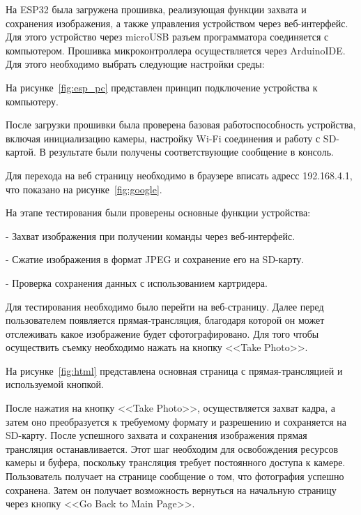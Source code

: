     На ESP32 была загружена прошивка, 
реализующая функции захвата и сохранения изображения, а также 
управления устройством через веб-интерфейс. Для этого устройство
через microUSB разъем программатора соединяется с компьютером.
Прошивка микроконтроллера осуществляется через ArduinoIDE.
Для этого необходимо выбрать следующие настройки среды:


    На рисунке~\ref{fig:esp_pc} представлен принцип подключение устройства к 
компьютеру.


После загрузки 
прошивки была проверена базовая работоспособность устройства, 
включая инициализацию камеры, настройку Wi-Fi соединения и 
работу с SD-картой. В результате были получены соответствующие 
сообщение в консоль.


    Для перехода на веб страницу необходимо в браузере вписать 
адресс 192.168.4.1, что показано на рисунке~\ref{fig:google}.


    На этапе тестирования были 
проверены основные функции устройства:

    - Захват изображения при получении команды через веб-интерфейс.

    - Сжатие изображения в формат JPEG и сохранение его на SD-карту.

    - Проверка сохранения данных с использованием картридера.

    Для тестирования необходимо было перейти на веб-страницу.
Далее перед пользователем появляется прямая-трансляция, 
благодаря которой он может отслеживать какое изображение 
будет сфотографировано. Для того чтобы осуществить съемку
необходимо нажать на кнопку <<Take Photo>>.

    На рисунке~\ref{fig:html} представлена основная страница с прямая-трансляцией
и используемой кнопкой.    


    После нажатия на кнопку <<Take Photo>>, осуществляется 
захват кадра, а затем оно преобразуется к требуемому
формату и разрешению и сохраняется на SD-карту. После 
успешного захвата и сохранения изображения прямая 
трансляция останавливается. Этот шаг необходим для 
освобождения ресурсов камеры и буфера, поскольку 
трансляция требует постоянного доступа к камере. 
Пользователь получает
на странице сообщение о том, что фотография успешно 
сохранена. Затем он получает возможность вернуться 
на начальную страницу через кнопку <<Go Back to Main Page>>.

